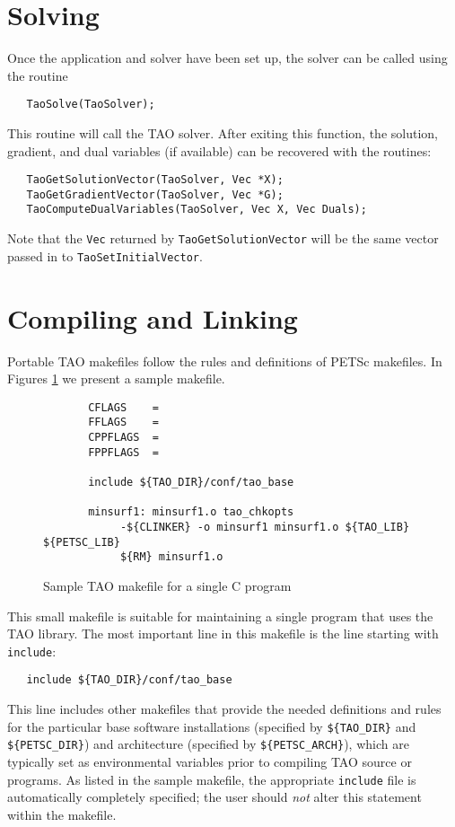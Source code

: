 \section{Solving}
Once the application and solver have been set up, the solver can be called using the routine
\begin{verbatim}
   TaoSolve(TaoSolver);
\end{verbatim}
\noindent
This  routine will call the TAO solver. 
After exiting this function, the solution, gradient, and dual variables (if
available) can be
recovered with the routines:
\begin{verbatim}
   TaoGetSolutionVector(TaoSolver, Vec *X);
   TaoGetGradientVector(TaoSolver, Vec *G);
   TaoComputeDualVariables(TaoSolver, Vec X, Vec Duals);
\end{verbatim}
\noindent
Note that the {\tt Vec} returned by {\tt TaoGetSolutionVector} will be
the same vector passed in to {\tt TaoSetInitialVector}.



\section{Compiling and Linking}

Portable TAO makefiles follow the rules and definitions
of PETSc makefiles.
In Figures \ref{fig:make3} we present a sample makefile.

\begin{figure}[tbh]
{\footnotesize
\begin{verbatim}   
       CFLAGS    = 
       FFLAGS    = 
       CPPFLAGS  =
       FPPFLAGS  =
       
       include ${TAO_DIR}/conf/tao_base
   
       minsurf1: minsurf1.o tao_chkopts
            -${CLINKER} -o minsurf1 minsurf1.o ${TAO_LIB} ${PETSC_LIB}
            ${RM} minsurf1.o
\end{verbatim} 
\noindent
}
\caption{Sample TAO makefile for a single C program}
\label{fig:make3}
\end{figure}

This small makefile is suitable for maintaining a single program that
uses the TAO library.  The most important line in this makefile is the
line starting with {\tt include}:

\begin{verbatim}
   include ${TAO_DIR}/conf/tao_base
\end{verbatim}
\noindent %
This line includes other makefiles that provide the needed definitions
and rules for the particular base software installations (specified by
{\tt \$\{TAO\_DIR\}} and {\tt \$\{PETSC\_DIR\}}) and architecture
(specified by {\tt \$\{PETSC\_ARCH\}}), which are typically set as
environmental variables prior to compiling TAO source or programs.  As
listed in the sample makefile, the appropriate {\tt include} file is
automatically completely specified; the user should {\em not} alter
this statement within the makefile.
 
